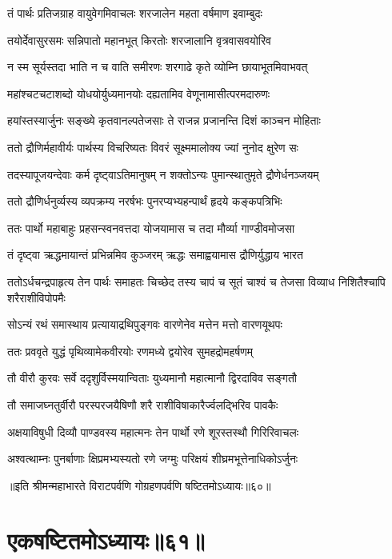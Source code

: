 \twolineshloka
{तं पार्थः प्रतिजग्राह वायुवेगमिवाचलः}
{शरजालेन महता वर्षमाण इवाम्बुदः}


\twolineshloka
{तयोर्देवासुरसमः सन्निपातो महानभूत्}
{किरतोः शरजालानि वृत्रवासवयोरिव}


\twolineshloka
{न स्म सूर्यस्तदा भाति न च वाति समीरणः}
{शरगाढे कृते व्योम्नि छायाभूतमिवाभवत्}


\twolineshloka
{महांश्चटचटाशब्दो योधयोर्युध्यमानयोः}
{दह्यतामिव वेणूनामासीत्परमदारुणः}


\twolineshloka
{हयांस्तस्यार्जुनः सङ्ख्ये कृतवानल्पतेजसाः}
{ते राजन्न प्रजानन्ति दिशं काञ्चन मोहिताः}


\twolineshloka
{ततो द्रौणिर्महावीर्यः पार्थस्य विचरिष्यतः}
{विवरं सूक्ष्ममालोक्य ज्यां नुनोद क्षुरेण सः}


\twolineshloka
{तदस्यापूजयन्देवाः कर्म दृष्ट्वाऽतिमानुषम्}
{न शक्तोऽन्यः पुमान्स्थातुमृते द्रौणेर्धनञ्जयम्}


\twolineshloka
{ततो द्रौणिर्धनुर्व्यस्य व्यपक्रम्य नरर्षभः}
{पुनरप्यभ्यहन्पार्थं हृदये कङ्कपत्रिभिः}



\twolineshloka
{ततः पार्थो महाबाहुः प्रहसन्स्वनवत्तदा}
{योजयामास च तदा मौर्व्या गाण्डीवमोजसा}


\twolineshloka
{तं दृष्ट्वा ऋद्धमायान्तं प्रभिन्नमिव कुञ्जरम्}
{ऋद्धः समाह्वयामास द्रौणिर्युद्धाय भारत}


\threelineshloka
{ततोऽर्धचन्द्रपाहृत्य तेन पार्थः समाहतः}
{चिच्छेद तस्य चापं च सूतं चाश्वं च तेजसा}
{विव्याध निशितैश्चापि शरैराशीविपोपमैः}


\twolineshloka
{सोऽन्यं रथं समास्थाय प्रत्यायाद्रथिपुङ्गवः}
{वारणेनेव मत्तेन मत्तो वारणयूथपः}


\twolineshloka
{ततः प्रववृते युद्धं पृथिव्यामेकवीरयोः}
{रणमध्ये द्वयोरेव सुमहद्रोमहर्षणम्}


\twolineshloka
{तौ वीरौ कुरवः सर्वे ददृशुर्विस्मयान्विताः}
{युध्यमानौ महात्मानौ द्विरदाविव सङ्गतौ}


\twolineshloka
{तौ समाजघ्नतुर्वीरौ परस्परजयैषिणौ}
{शरै राशीविषाकारैर्ज्वलद्भिरिव पावकैः}


\twolineshloka
{अक्षयाविषुधी दिव्यौ पाण्डवस्य महात्मनः}
{तेन पार्थो रणे शूरस्तस्थौ गिरिरिवाचलः}


\twolineshloka
{अश्वत्थाम्नः पुनर्बाणाः क्षिप्रमभ्यस्यतो रणे}
{जग्मुः परिक्षयं शीघ्रमभूत्तेनाधिकोऽर्जुनः}

॥इति श्रीमन्महाभारते विराटपर्वणि गोग्रहणपर्वणि षष्टितमोऽध्यायः॥६०॥

\chapter{एकषष्टितमोऽध्यायः॥६१॥}

